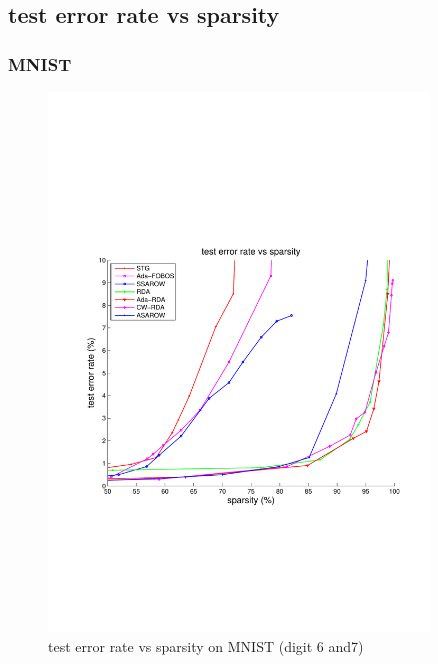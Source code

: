 \documentclass{article}
\begin{document}
\subsection{test error rate vs sparsity}
\subsubsection{MNIST}
\begin{figure}[!h]
\centering
\includegraphics[width=0.9\textwidth]{./figs/MNIST67_test.pdf}
\caption{test error rate vs sparsity on MNIST (digit 6 and7)}
\label{fig:00}
\end{figure}
\end{document}
